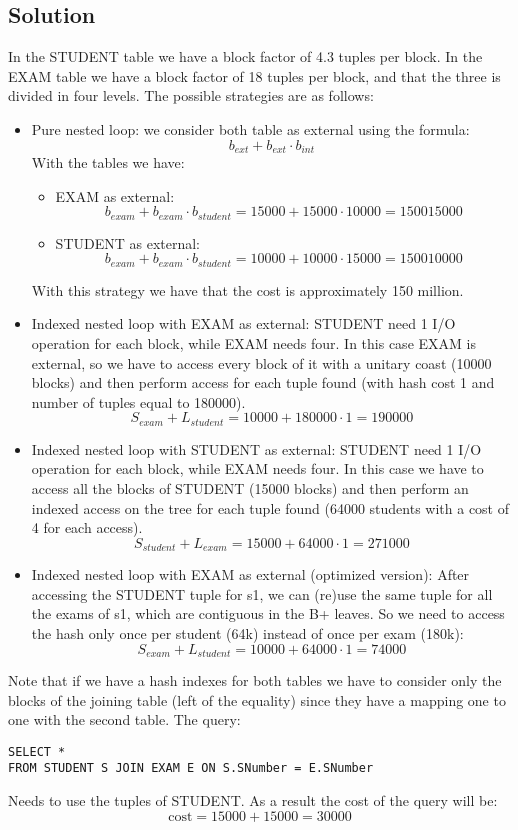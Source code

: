 \subsection*{Solution}
In the STUDENT table we have a block factor of 4.3 tuples per block. 
In the EXAM table we have a block factor of 18 tuples per block, and that the three is divided in four levels. 
The possible strategies are as follows: 
\begin{itemize}
    \item Pure nested loop: we consider both table as external using the formula: 
        \[b_{ext}+b_{ext}\cdot b_{int}\]
        With the tables we have: 
        \begin{itemize}
            \item EXAM as external: 
                \[b_{exam}+b_{exam}\cdot b_{student}=15000+15000\cdot 10000=150015000\]
            \item STUDENT as external: 
                \[b_{exam}+b_{exam}\cdot b_{student}=10000+10000\cdot 15000=150010000\]
        \end{itemize}
        With this strategy we have that the cost is approximately 150 million. 
    \item Indexed nested loop with EXAM as external: 
        STUDENT need 1 I/O operation for each block, while EXAM needs four. 
        In this case EXAM is external, so we have to access every block of it with a unitary coast (10000 blocks) and then perform access for each tuple found (with hash cost 1 and number of tuples equal to 180000).
        \[S_{exam}+L_{student}=10000+180000 \cdot 1=190000\]
    \item Indexed nested loop with STUDENT as external: 
        STUDENT need 1 I/O operation for each block, while EXAM needs four. 
        In this case we have to access all the blocks of STUDENT (15000 blocks) and then perform an indexed access on the tree for each tuple found (64000 students with a cost of 4 for each access). 
        \[S_{student}+L_{exam}=15000+64000 \cdot 1=271000\]
    \item Indexed nested loop with EXAM as external (optimized version): 
        After accessing the STUDENT tuple for s1, we can (re)use the same tuple for all the exams of s1, which are contiguous in the B+ leaves. 
        So we need to access the hash only once per student (64k) instead of once per exam (180k): 
        \[S_{exam}+L_{student}=10000+64000 \cdot 1=74000\]
\end{itemize}
Note that if we have a hash indexes for both tables we have to consider only the blocks of the joining table (left of the equality) since they have a mapping one to one with the second table. 
The query: 
\begin{lstlisting}[style=SQL]
SELECT *
FROM STUDENT S JOIN EXAM E ON S.SNumber = E.SNumber 
\end{lstlisting}
Needs to use the tuples of STUDENT. 
As a result the cost of the query will be: 
\[\text{cost}=15000+15000=30000\]